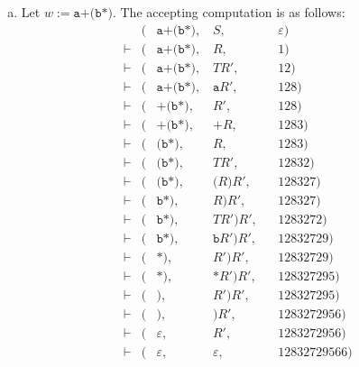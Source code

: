 \begin{solution}
\begin{enumerate}[(a)]
\item Let $w:= \texttt{a+(b*)}$.
    The accepting computation is as follows:
    \begin{align*}
           & (&\texttt{a+(b*)},\; &S,                        &&\varepsilon) \\
    \vdash & (&\texttt{a+(b*)},\; &R,                        &&1) \\
    \vdash & (&\texttt{a+(b*)},\; &TR',                      &&12) \\
    \vdash & (&\texttt{a+(b*)},\; &\texttt{a}R',             &&128) \\
    \vdash & (&\texttt{+(b*)},\;  &R',                       &&128) \\
    \vdash & (&\texttt{+(b*)},\;  &\texttt{+}R,              &&1283) \\
    \vdash & (&\texttt{(b*)},\;   &R,                        &&1283) \\
    \vdash & (&\texttt{(b*)},\;   &TR',                      &&12832) \\
    \vdash & (&\texttt{(b*)},\;   &\texttt{(}R\texttt{)}R',  &&128327) \\
    \vdash & (&\texttt{b*)},\;    &R\texttt{)}R',            &&128327) \\
    \vdash & (&\texttt{b*)},\;    &TR'\texttt{)}R',          &&1283272) \\
    \vdash & (&\texttt{b*)},\;    &\texttt{b}R'\texttt{)}R', &&12832729) \\
    \vdash & (&\texttt{*)},\;     &R'\texttt{)}R',           &&12832729) \\
    \vdash & (&\texttt{*)},\;     &\texttt{*}R'\texttt{)}R', &&128327295) \\
    \vdash & (&\texttt{)},\;      &R'\texttt{)}R',           &&128327295) \\
    \vdash & (&\texttt{)},\;      &\texttt{)}R',             &&1283272956) \\
    \vdash & (&\varepsilon,\;     &R',                       &&1283272956) \\
    \vdash & (&\varepsilon,\;     &\varepsilon,              &&12832729566)
    \end{align*}
\end{enumerate}
\end{solution}

